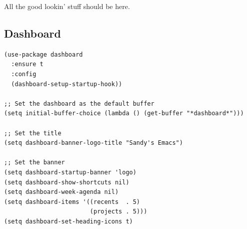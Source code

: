 \documentclass[10pt]{article}
\begin{document}
All the good lookin' stuff should be here.
\subsection{Dashboard}
\label{sec:org72f99ce}
\begin{verbatim}
(use-package dashboard
  :ensure t
  :config
  (dashboard-setup-startup-hook))

;; Set the dashboard as the default buffer
(setq initial-buffer-choice (lambda () (get-buffer "*dashboard*")))

;; Set the title
(setq dashboard-banner-logo-title "Sandy's Emacs")

;; Set the banner
(setq dashboard-startup-banner 'logo)
(setq dashboard-show-shortcuts nil)
(setq dashboard-week-agenda nil)
(setq dashboard-items '((recents  . 5)
                        (projects . 5)))
(setq dashboard-set-heading-icons t)
\end{verbatim}
\end{document}
